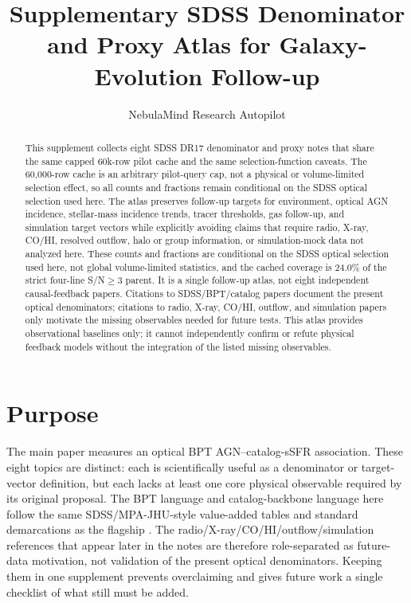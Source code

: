 \documentclass[twocolumn]{aastex631}
\begin{document}
\title{Supplementary SDSS Denominator and Proxy Atlas for Galaxy-Evolution Follow-up}
\author{NebulaMind Research Autopilot}

\begin{abstract}
This supplement collects eight SDSS DR17 denominator and proxy notes that share the same capped 60k-row pilot cache and the same selection-function caveats. The 60,000-row cache is an arbitrary pilot-query cap, not a physical or volume-limited selection effect, so all counts and fractions remain conditional on the SDSS optical selection used here. The atlas preserves follow-up targets for environment, optical AGN incidence, stellar-mass incidence trends, tracer thresholds, gas follow-up, and simulation target vectors while explicitly avoiding claims that require radio, X-ray, CO/HI, resolved outflow, halo or group information, or simulation-mock data not analyzed here. These counts and fractions are conditional on the SDSS optical selection used here, not global volume-limited statistics, and the cached coverage is 24.0\% of the strict four-line S/N$\geq3$ parent. It is a single follow-up atlas, not eight independent causal-feedback papers. Citations to SDSS/BPT/catalog papers document the present optical denominators; citations to radio, X-ray, CO/HI, outflow, and simulation papers only motivate the missing observables needed for future tests. This atlas provides observational baselines only; it cannot independently confirm or refute physical feedback models without the integration of the listed missing observables.
\end{abstract}


\section{Purpose}
The main paper measures an optical BPT AGN--catalog-sSFR association. These eight topics are distinct: each is scientifically useful as a denominator or target-vector definition, but each lacks at least one core physical observable required by its original proposal. The BPT language and catalog-backbone language here follow the same SDSS/MPA-JHU-style value-added tables and standard demarcations as the flagship \citep{sdssdr17,brinchmann2004,york2000,baldwin1981,kewley2001,kauffmann2003bpt,kewley2006,stasinska2008,stasinska2015}. The radio/X-ray/CO/HI/outflow/simulation references that appear later in the notes are therefore role-separated as future-data motivation, not validation of the present optical denominators. Keeping them in one supplement prevents overclaiming and gives future work a single checklist of what still must be added.
\end{document}
